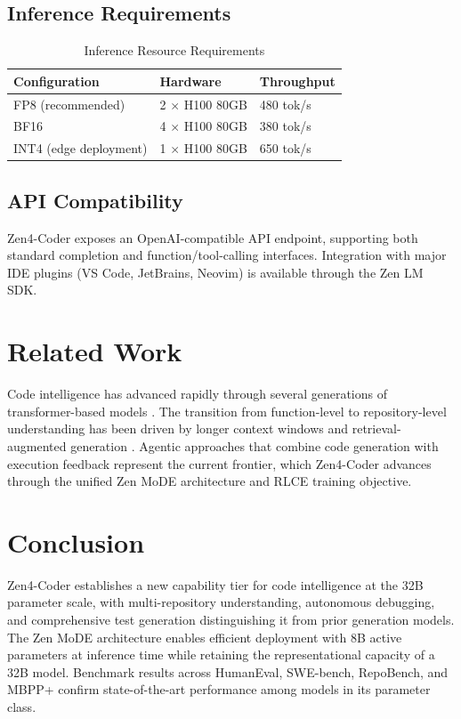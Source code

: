 \documentclass[11pt,a4paper]{article}
\begin{document}
\subsection{Inference Requirements}

\begin{table}[H]
\centering
\caption{Inference Resource Requirements}
\begin{tabular}{lll}
\toprule
\textbf{Configuration} & \textbf{Hardware} & \textbf{Throughput} \\
\midrule
FP8 (recommended) & 2 $\times$ H100 80GB & 480 tok/s \\
BF16 & 4 $\times$ H100 80GB & 380 tok/s \\
INT4 (edge deployment) & 1 $\times$ H100 80GB & 650 tok/s \\
\bottomrule
\end{tabular}
\end{table}

\subsection{API Compatibility}

Zen4-Coder exposes an OpenAI-compatible API endpoint, supporting both standard completion and function/tool-calling interfaces. Integration with major IDE plugins (VS Code, JetBrains, Neovim) is available through the Zen LM SDK.

\section{Related Work}

Code intelligence has advanced rapidly through several generations of transformer-based models \cite{codex,alphacode,starcoder,codellama}. The transition from function-level to repository-level understanding has been driven by longer context windows and retrieval-augmented generation \cite{repocoder,swebench}. Agentic approaches that combine code generation with execution feedback \cite{agentless,swebenchagent} represent the current frontier, which Zen4-Coder advances through the unified Zen MoDE architecture and RLCE training objective.

\section{Conclusion}

Zen4-Coder establishes a new capability tier for code intelligence at the 32B parameter scale, with multi-repository understanding, autonomous debugging, and comprehensive test generation distinguishing it from prior generation models. The Zen MoDE architecture enables efficient deployment with 8B active parameters at inference time while retaining the representational capacity of a 32B model. Benchmark results across HumanEval, SWE-bench, RepoBench, and MBPP+ confirm state-of-the-art performance among models in its parameter class.
\end{document}
